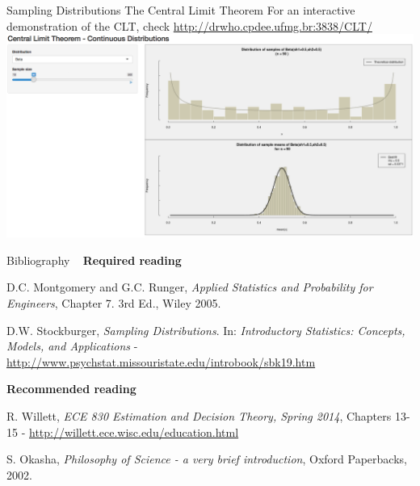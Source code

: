 \documentclass[t]{beamer}
\begin{document}
\begin{ftst}
{Sampling Distributions}
{The Central Limit Theorem}
For an interactive demonstration of the CLT, check 
{\small\url{http://drwho.cpdee.ufmg.br:3838/CLT/}}
\vone
{\centering\includegraphics[width=\textwidth]{../figs/CLTdemo.png}}
\end{ftst}



\begin{ftst}
{Bibliography}
{\ }
\scriptsize
\textbf{Required reading}

\benums D.C. Montgomery and G.C. Runger, \textit{Applied Statistics and Probability for Engineers}, Chapter 7. 3rd Ed., Wiley 2005.
\item D.W. Stockburger, \textit{Sampling Distributions}. In: \textit{Introductory Statistics: Concepts, Models, and Applications} - \url{http://www.psychstat.missouristate.edu/introbook/sbk19.htm}
\eenum

\textbf{Recommended reading}

\benums R. Willett, \textit{ ECE 830 Estimation and Decision Theory, Spring 2014}, Chapters 13-15 - \url{http://willett.ece.wisc.edu/education.html}
\item S. Okasha, \textit{Philosophy of Science - a very brief introduction}, Oxford Paperbacks, 2002.
\eenum
\end{ftst}

\end{document}
